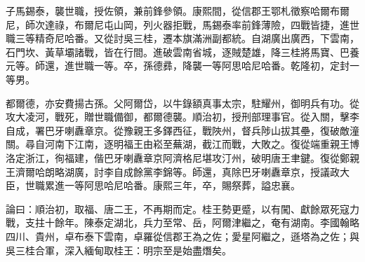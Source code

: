 \begin{pinyinscope}
子馬錫泰，襲世職，授佐領，兼前鋒參領。康熙間，從信郡王鄂札徵察哈爾布爾尼，師次達祿，布爾尼屯山岡，列火器拒戰，馬錫泰率前鋒薄險，四戰皆捷，進世職三等精奇尼哈番。又從討吳三桂，遷本旗滿洲副都統。自湖廣出廣西，下雲南，石門坎、黃草壩諸戰，皆在行間。進破雲南省城，逐賊楚雄，降三桂將馬寶、巴養元等。師還，進世職一等。卒，孫德彞，降襲一等阿思哈尼哈番。乾隆初，定封一等男。

都爾德，亦安費揚古孫。父阿爾岱，以牛錄額真事太宗，駐耀州，御明兵有功。從攻大凌河，戰死，贈世職備御，都爾德襲。順治初，授刑部理事官。從入關，擊李自成，署巴牙喇纛章京。從豫親王多鐸西征，戰陜州，督兵陟山拔其壘，復破敵潼關。尋自河南下江南，逐明福王由崧至蕪湖，截江而戰，大敗之。復從端重親王博洛定浙江，徇福建，偕巴牙喇纛章京阿濟格尼堪攻汀州，破明唐王聿鍵。復從鄭親王濟爾哈朗略湖廣，討李自成餘黨李錦等。師還，真除巴牙喇纛章京，授議政大臣，世職累進一等阿思哈尼哈番。康熙三年，卒，賜祭葬，謚忠襄。

論曰：順治初，取福、唐二王，不再期而定。桂王勢更蹙，以有闖、獻餘眾死寇力戰，支拄十餘年。陳泰定湖北，兵力至常、岳，阿爾津繼之，奄有湖南。李國翰略四川、貴州，卓布泰下雲南，卓羅從信郡王為之佐；愛星阿繼之，遜塔為之佐；與吳三桂合軍，深入緬甸取桂王：明宗至是始盡熸矣。


\end{pinyinscope}